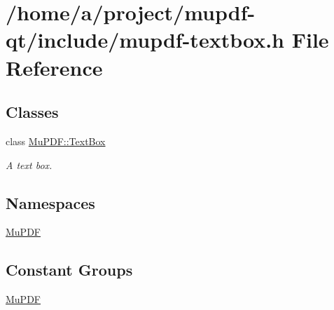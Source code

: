 \hypertarget{mupdf-textbox_8h}{\section{/home/a/project/mupdf-\/qt/include/mupdf-\/textbox.h File Reference}
\label{mupdf-textbox_8h}
}
\subsection*{Classes}
\begin{DoxyCompactItemize}
\item 
class \hyperlink{class_mu_p_d_f_1_1_text_box}{Mu\-P\-D\-F\-::\-Text\-Box}
\begin{DoxyCompactList}\small\item\em A text box. \end{DoxyCompactList}\end{DoxyCompactItemize}
\subsection*{Namespaces}
\begin{DoxyCompactItemize}
\item 
\hyperlink{namespace_mu_p_d_f}{Mu\-P\-D\-F}
\end{DoxyCompactItemize}
\subsection*{Constant Groups}
\begin{DoxyCompactItemize}
\item 
\hyperlink{namespace_mu_p_d_f}{Mu\-P\-D\-F}
\end{DoxyCompactItemize}
